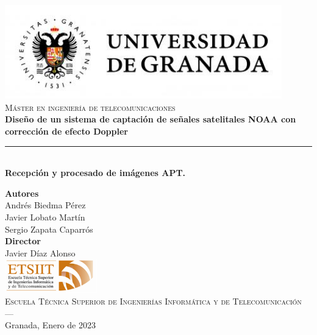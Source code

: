 \begin{titlepage}
 
 
\newlength{\centeroffset}
\setlength{\centeroffset}{-0.5\oddsidemargin}
\addtolength{\centeroffset}{0.5\evensidemargin}
\thispagestyle{empty}

\noindent\hspace*{\centeroffset}\begin{minipage}{\textwidth}

\centering
\includegraphics[width=0.9\textwidth]{imagenes/logo_ugr.jpg}\\[1.4cm]

\textsc{ \Large Máster en ingeniería de telecomunicaciones}\\[1cm]
% 
{\LARGE \bfseries Diseño de un sistema de captación de señales satelitales NOAA con corrección de efecto Doppler\\
}
\noindent\rule[-1ex]{\textwidth}{3pt}\\[3.5ex]
{\large\bfseries Recepción y procesado de imágenes APT.}
\end{minipage}

\vspace{1cm}
\noindent\hspace*{\centeroffset}\begin{minipage}{\textwidth}
\centering

\textbf{Autores}\\ {Andrés Biedma Pérez\\Javier Lobato Martín\\Sergio Zapata Caparrós}\\[2.5ex]
\textbf{Director}\\
{Javier Díaz Alonso}\\[2cm]
\includegraphics[width=0.3\textwidth]{imagenes/etsiit_logo.png}\\[0.1cm]
\textsc{Escuela Técnica Superior de Ingenierías Informática y de Telecomunicación}\\
\textsc{---}\\
Granada, Enero de 2023
\end{minipage}
\end{titlepage}


